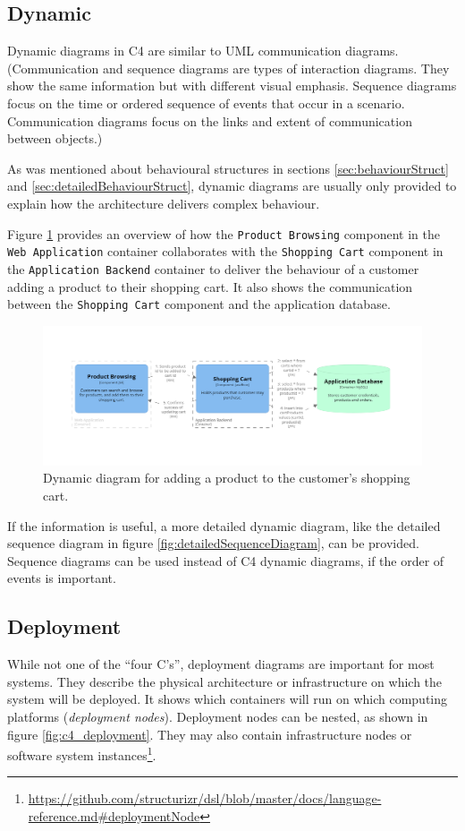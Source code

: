 \subsection{Dynamic}
Dynamic diagrams in C4 are similar to UML communication diagrams.
(Communication and sequence diagrams are types of interaction diagrams.
They show the same information but with different visual emphasis.
Sequence diagrams focus on the time or ordered sequence of events that occur in a scenario.
Communication diagrams focus on the links and extent of communication between objects.)

As was mentioned about behavioural structures in sections \ref{sec:behaviourStruct} and \ref{sec:detailedBehaviourStruct},
dynamic diagrams are usually only provided to explain how the architecture delivers complex behaviour.

Figure \ref{fig:c4_dynamic} provides an overview of how the
\texttt{Product Browsing} component in the \texttt{Web Application} container collaborates with the
\texttt{Shopping Cart} component in the \texttt{Application Backend} container
to deliver the behaviour of a customer adding a product to their shopping cart.
It also shows the communication between the \texttt{Shopping Cart} component and the application database.

\begin{figure}[h!]
    \centering
    \includegraphics[trim=175 225 197 185,clip,width=\textwidth]{images/c4/add_to_cart_dynamic_diagram.png}
    \caption{Dynamic diagram for adding a product to the customer's shopping cart.}
    \label{fig:c4_dynamic}
\end{figure}

\noindent
If the information is useful, a more detailed dynamic diagram, like the detailed sequence diagram in figure \ref{fig:detailedSequenceDiagram}, can be provided.
Sequence diagrams can be used instead of C4 dynamic diagrams, if the order of events is important.

\subsection{Deployment}\label{sec:c4_deployment}
While not one of the ``four C's'', deployment diagrams are important for most systems.
They describe the physical architecture or infrastructure on which the system will be deployed.
It shows which containers will run on which computing platforms (\emph{deployment nodes}).
Deployment nodes can be nested, as shown in figure \ref{fig:c4_deployment}.
They may also contain infrastructure nodes or software system instances\footnote{\url{https://github.com/structurizr/dsl/blob/master/docs/language-reference.md\#deploymentNode}}.

